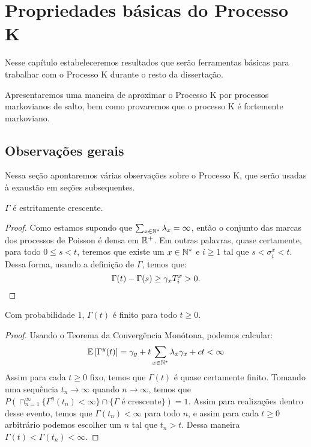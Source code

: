 \chapter{Propriedades básicas do Processo K}
\label{cap:propriedades}

Nesse capítulo estabeleceremos resultados que serão ferramentas
básicas para trabalhar com o Processo K durante o resto da
dissertação.

Apresentaremos uma maneira de aproximar o Processo K por processos
markovianos de salto, bem como provaremos que o processo K é
fortemente markoviano.


\section{Observações gerais}
\label{sec:observacoes}

Nessa seção apontaremos várias observações sobre o Processo K, que
serão usadas à exaustão em seções subsequentes.

\begin{proposicao}
  \label{prop:gamma-crescente}
  $\Gamma$ é \qc estritamente crescente.
\end{proposicao}
\begin{proof}
  Como estamos supondo que $\sum_{x \in {\mathbb{N^*}}} \lambda_x = \infty$,
  então o conjunto das marcas dos processos de Poisson é \qc densa em
  ${\mathbb{R}}^+$. Em outras palavras, quase certamente, para todo $0 \leq s <
  t$, teremos que existe um $x \in {\mathbb{N^*}}$ e $i \geq 1$ tal que $s <
  \sigma^x_i < t$. Dessa forma, usando a definição de $\Gamma$, temos
  que:
  \begin{displaymath}
    \Gamma(t) - \Gamma(s) \geq \gamma_x T^x_i > 0.
    \qedhere
  \end{displaymath}
\end{proof}

\begin{proposicao}
  \label{prop:gamma-finita}
  Com probabilidade $1$, $\Gamma(t)$ é finito para todo $t \geq 0$.
\end{proposicao}
\begin{proof}
  Usando o Teorema da Convergência Monótona, podemos calcular:
  \begin{displaymath}
    {\mathbb{E}} \left[\Gamma^y(t) \right] = \gamma_y + t \sum_{x \in {\mathbb{N^*}}}
    \lambda_x \gamma_x + ct < \infty
  \end{displaymath}
  Assim para cada $t \geq 0$ fixo, temos que $\Gamma(t)$ é quase
  certamente finito. Tomando uma sequência $t_n \to \infty$ quando $n
  \to \infty$, temos que $P(\cap_{n = 1}^{\infty} \{ \Gamma^y (t_n)
  < \infty \} \cap \{ \Gamma \textrm{ é crescente}\}) = 1$. Assim para
  realizações dentro desse evento, temos que $\Gamma(t_n) < \infty$
  para todo $n$, e assim para cada $t \geq 0$ arbitrário podemos
  escolher um $n$ tal que $t_n > t$. Dessa maneira $\Gamma(t) <
  \Gamma(t_n) < \infty$.
\end{proof}


